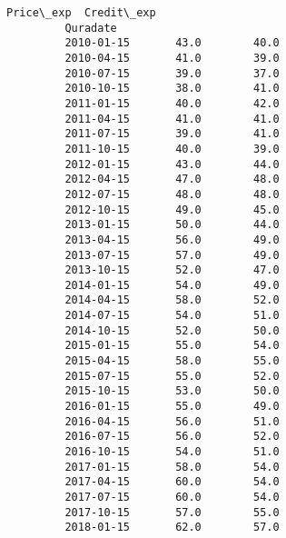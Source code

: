 \documentclass[11pt]{article}
\begin{document}
\begin{Verbatim}[commandchars=\\\{\}]
                     Price\_exp  Credit\_exp  
         Quradate                           
         2010-01-15       43.0        40.0  
         2010-04-15       41.0        39.0  
         2010-07-15       39.0        37.0  
         2010-10-15       38.0        41.0  
         2011-01-15       40.0        42.0  
         2011-04-15       41.0        41.0  
         2011-07-15       39.0        41.0  
         2011-10-15       40.0        39.0  
         2012-01-15       43.0        44.0  
         2012-04-15       47.0        48.0  
         2012-07-15       48.0        48.0  
         2012-10-15       49.0        45.0  
         2013-01-15       50.0        44.0  
         2013-04-15       56.0        49.0  
         2013-07-15       57.0        49.0  
         2013-10-15       52.0        47.0  
         2014-01-15       54.0        49.0  
         2014-04-15       58.0        52.0  
         2014-07-15       54.0        51.0  
         2014-10-15       52.0        50.0  
         2015-01-15       55.0        54.0  
         2015-04-15       58.0        55.0  
         2015-07-15       55.0        52.0  
         2015-10-15       53.0        50.0  
         2016-01-15       55.0        49.0  
         2016-04-15       56.0        51.0  
         2016-07-15       56.0        52.0  
         2016-10-15       54.0        51.0  
         2017-01-15       58.0        54.0  
         2017-04-15       60.0        54.0  
         2017-07-15       60.0        54.0  
         2017-10-15       57.0        55.0  
         2018-01-15       62.0        57.0  
\end{Verbatim}
            
\end{document}
